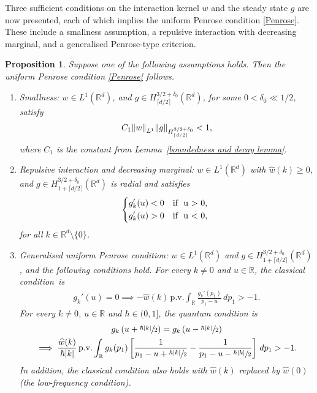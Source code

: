 \documentclass[JEP,XML,SOM,Unicode]{cedram}
\newenvironment{enumeratei}
{\bgroup\def\theenumi{\roman{enumi}}\def\theenumii{\arabic{enumii}}\begin{enumerate}}
{\end{enumerate}\egroup}
\newenvironment{mycases}
{\begin{dcases*}}
{\end{dcases*}}
\theoremstyle{plain}
\newtheorem{proposition}[theorem]{Proposition}
\theoremstyle{remark}
\newcommand{\br}[1]{\left(#1\right)}
\newcommand{\ak}{\abs{k}}
\newcommand{\sbr}[1]{\left[#1\right]}
\newcommand{\R}{\mathbb{R}}
\newcommand{\ceils}[1]{\lceil#1\rceil}
\begin{document}
Three sufficient conditions on the interaction kernel \( w \) and the steady state \( g \) are now presented, each of which implies the uniform Penrose condition \eqref{Penrose}. These include a smallness assumption, a repulsive interaction with decreasing marginal, and a generalised Penrose-type criterion.
\begin{proposition}\label{sufficientforPenrose}
Suppose one of the following assumptions holds. Then the uniform Penrose condition \eqref{Penrose} follows.
\begin{enumeratei}
\item \label{smallness} \textit{Smallness:}
\( w \in L^1(\R^d) \), and \( g \in H^{3/2+\delta_0}_{\lceil d/2 \rceil}(\R^d) \), for some \( 0 < \delta_0 \ll 1/2 \), satisfy
\[
C_1 \norm{w}_{L^1} \norm{g}_{H^{3/2+\delta_0}_{\lceil d/2 \rceil}} < 1,
\]
where \( C_1 \) is the constant from Lemma~\ref{boundedness and decay lemma}.
\item \label{marginal} \textit{Repulsive interaction and decreasing marginal:}
\( w \in L^1(\R^d) \) with \( \widehat w(k) \geq 0 \), and \( g \in H^{3/2+\delta_0}_{1 + \lceil d/2 \rceil}(\R^d) \) is radial and satisfies
\begin{align}\label{marginalcases}
\begin{mycases}
g_k'(u) < 0 & \text{if } u > 0, \\
g_k'(u) > 0 & \text{if } u < 0,
\end{mycases}
\end{align}
for all \( k \in \R^d\setminus\{0\} \).
\item \textit{Generalised uniform Penrose condition:} \label{generalisedPenrose(iii)} $w\in L^1(\R^d)$ and $g\in H^{3/2+\delta_0}_{1+\ceils{d/2}}(\R^d)$, and the following conditions hold. For every $k\neq0$ and $u\in\R$, the classical condition~is
\begin{align*}
g_k'(u)=0\implies -\widehat w(k)\,\mathrm{p.v.}\int_{\R}\frac{g_k'(p_1)}{p_1-u}\,dp_1>-1.
\end{align*}
For every $k\neq0$, $u\in\R$ and $\hbar\in(0,1]$, the quantum condition is
\begin{multline*}
g_k\br{u+\sfrac{\hbar\ak}{2}}=g_k\br{u-\sfrac{\hbar \ak}{2}}\\
\implies
\frac{\widehat w(k)}{\hbar \ak}\,\mathrm{p.v.}\int_{\R}g_k(p_1)\sbr{\frac{1}{p_1-u+\sfrac{\hbar\ak}{2}}-\frac{1}{p_1-u-\sfrac{\hbar \ak}{2}}}\,dp_1>- 1.
\end{multline*}
In addition, the classical condition also holds with $\widehat w(k)$ replaced by $\widehat w(0)$ (the low-frequency condition).
\end{enumeratei}

\end{proposition}
\end{document}

